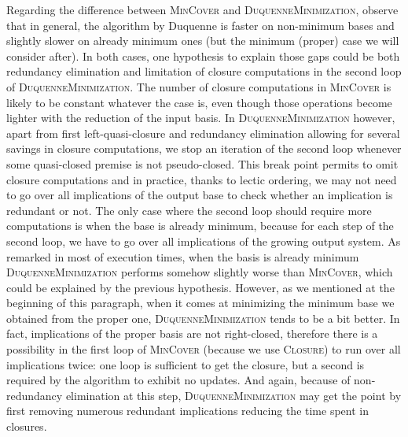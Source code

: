 \documentclass[runningheads]{llncs}
\begin{document}
Regarding the difference between \textsc{MinCover} and \textsc{DuquenneMinimization}, observe that in general, the algorithm by Duquenne is faster on non-minimum bases and slightly slower on already minimum ones (but the minimum (proper) case we will consider after). In both cases, one hypothesis to explain those gaps could be both redundancy elimination and limitation of closure computations in the second loop of \textsc{DuquenneMinimization}. The number of closure computations in \textsc{MinCover} is likely to be constant whatever the case is, even though
those operations become lighter with the reduction of the input basis. In \textsc{DuquenneMinimization} however, apart from first left-quasi-closure and
redundancy elimination allowing for several savings in closure computations, we stop an iteration of the second loop whenever some quasi-closed premise is not
pseudo-closed. This break point permits to omit closure computations and in practice, thanks to lectic ordering, we may not need to go over all implications of the output base to check whether an implication is redundant or not. The only case where the second loop should require more computations is when the base is already minimum, because for each step of the second loop, we have to go over all implications of the growing output system. As remarked in most of execution times, when the basis is already minimum \textsc{DuquenneMinimization} performs somehow slightly worse than 
\textsc{MinCover}, which could be explained by the previous hypothesis. However,
as we mentioned at the beginning of this paragraph, when it comes at minimizing
the minimum base we obtained from the proper one, \textsc{DuquenneMinimization}
tends to be a bit better. In fact, implications of the proper basis are not
right-closed, therefore there is a possibility in the first loop of \textsc{MinCover} (because we use \textsc{Closure}) to run over all implications
twice: one loop is sufficient to get the closure, but a second is required by the algorithm to exhibit no updates. And again, because of non-redundancy elimination at this step, \textsc{DuquenneMinimization} may get the point by first removing numerous redundant implications reducing the time spent in closures.
\end{document}

